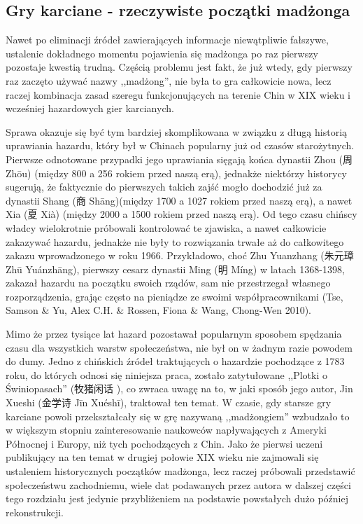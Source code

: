 \subsection{Gry karciane - rzeczywiste początki madżonga}
Nawet po eliminacji źródeł zawierających informacje niewątpliwie fałszywe,
ustalenie dokładnego momentu pojawienia się madżonga po raz pierwszy pozostaje
kwestią trudną. Częścią problemu jest fakt, że już wtedy, gdy pierwszy raz
zaczęto używać nazwy ,,madżong'', nie była to gra całkowicie nowa, lecz raczej
kombinacja zasad szeregu funkcjonujących na terenie Chin w XIX wieku i wcześniej
hazardowych gier karcianych. 

Sprawa okazuje się być tym bardziej skomplikowana w związku z długą historią
uprawiania hazardu, który był w Chinach popularny już od czasów starożytnych.
Pierwsze odnotowane przypadki jego uprawiania sięgają końca dynastii Zhou (周
Zhōu) (między 800 a 256 rokiem przed naszą erą), jednakże niektórzy historycy
sugerują, że faktycznie do pierwszych takich zajść mogło dochodzić już za
dynastii Shang (商 Shāng)(między 1700 a 1027 rokiem przed naszą erą), a nawet Xia
(夏 Xià) (między 2000 a 1500 rokiem przed naszą erą). Od tego czasu chińscy
władcy wielokrotnie próbowali kontrolować te zjawiska, a nawet całkowicie
zakazywać hazardu, jednakże nie były to rozwiązania trwałe aż do całkowitego
zakazu wprowadzonego w roku 1966. Przykładowo, choć Zhu Yuanzhang (朱元璋 Zhū
Yuánzhāng), pierwszy cesarz dynastii Ming (明 Míng) w latach 1368-1398, zakazał
hazardu na początku swoich rządów, sam nie przestrzegał własnego rozporządzenia,
grając często na pieniądze ze swoimi współpracownikami (Tse, Samson \& Yu, Alex
C.H. \& Rossen, Fiona \& Wang, Chong-Wen 2010).

Mimo że przez tysiące lat hazard pozostawał popularnym sposobem spędzania czasu
dla wszystkich warstw społeczeństwa, nie był on w żadnym razie powodem do dumy.
Jedno z chińskich źródeł traktujących o hazardzie pochodzące z 1783 roku, do
których odnosi się niniejsza praca, zostało zatytułowane ,,Plotki o
Świniopasach'' (牧猪闲话 ), co zwraca uwagę na to, w jaki
sposób jego autor, Jin Xueshi (金学诗 Jīn Xuéshī), traktował ten temat.  W czasie,
gdy starsze gry karciane powoli przekształcały się w grę nazywaną ,,madżongiem''
wzbudzało to w większym stopniu zainteresowanie naukowców napływających z
Ameryki Północnej i Europy, niż tych pochodzących z Chin. Jako że pierwsi uczeni
publikujący na ten temat w drugiej połowie XIX wieku nie zajmowali się
ustaleniem historycznych początków madżonga, lecz raczej próbowali przedstawić
społeczeństwu zachodniemu, wiele dat podawanych przez autora w dalszej części
tego rozdziału jest jedynie przybliżeniem na podstawie powstałych dużo później
rekonstrukcji.

